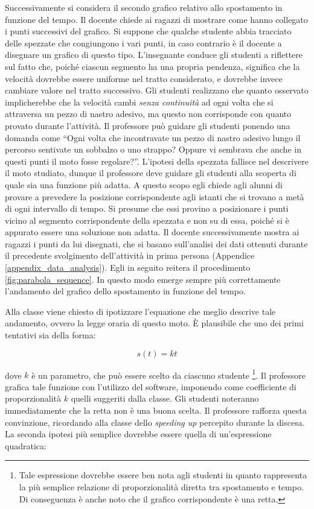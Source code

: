 \documentclass{report} \usepackage[T1]{fontenc} \usepackage[italian]{babel}
\begin{document}
Successivamente si considera il secondo grafico relativo allo spostamento in
funzione del tempo. Il docente chiede ai ragazzi di mostrare come hanno
collegato i punti successivi del grafico. Si suppone che qualche studente abbia
tracciato delle spezzate che congiungono i  vari punti, in caso contrario è il
docente a disegnare un grafico di questo tipo. L’insegnante conduce gli studenti a
riflettere sul fatto che, poiché ciascun segmento ha una propria pendenza,
significa che la velocità dovrebbe essere uniforme nel tratto considerato, e dovrebbe
invece cambiare valore nel tratto successivo. Gli studenti realizzano che
quanto osservato implicherebbe che la velocità cambi \emph{senza continuità}
ad ogni volta che si attraversa un pezzo di nastro adesivo, ma questo non
corrisponde con quanto provato durante l’attività.
Il professore può guidare gli studenti ponendo una domanda come
``Ogni volta che incontravate un pezzo di nastro adesivo lungo il percorso
sentivate un sobbalzo o uno strappo? Oppure vi sembrava che anche in questi
punti il moto fosse regolare?''.
L’ipotesi della spezzata
fallisce nel descrivere il moto studiato, dunque il professore deve guidare gli
studenti alla scoperta di quale sia una funzione più adatta. A questo scopo egli
chiede agli alunni di provare a prevedere la posizione corrispondente  agli
istanti che si trovano a metà di ogni intervallo di tempo.
Si presume che essi provino a posizionare i punti vicino al segmento
corrispondente della spezzata e non su di essa, poiché si è appurato essere una
soluzione non adatta. Il docente successivamente mostra ai ragazzi i punti da
lui disegnati, che si basano sull’analisi dei dati ottenuti durante il precedente
svolgimento
dell’attività in prima persona (Appendice \ref{appendix_data_analysis}).
Egli in seguito reitera il procedimento \ref{fig:parabola_sequence}.
In questo modo emerge sempre più correttamente l’andamento del grafico
dello spostamento in funzione del tempo.

Alla classe viene chiesto di ipotizzare
l’equazione che meglio descrive tale andamento, ovvero la legge oraria di questo moto.
\`E plausibile che uno dei primi tentativi sia della forma:

\begin{equation}
s(t) = kt
\end{equation}

dove $k$ è un parametro, che può essere scelto da ciascuno studente
\footnote{
          Tale espressione dovrebbe essere ben nota agli
          studenti in quanto rappresenta la più semplice relazione di proporzionalità
          diretta tra spostamento e tempo. Di conseguenza è anche noto che il grafico
          corrispondente è una retta.
         }.
Il professore grafica tale funzione con l’utilizzo del software,
imponendo come coefficiente di proporzionalità $k$ quelli suggeriti dalla classe.
Gli studenti noteranno immediatamente che la retta non è una buona scelta.
Il professore rafforza questa convinzione, ricordando alla classe dello
\emph{speeding up} percepito durante la discesa.
La seconda ipotesi più semplice dovrebbe essere quella di un'espressione quadratica:
\end{document}
